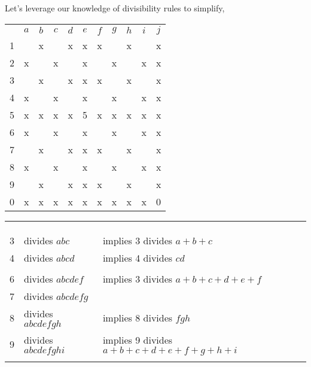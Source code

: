 Let's leverage our knowledge of divisibility rules to simplify,
\begin{center}
\begin{tabular}{ccccccccccc}
			&	$a$	&	$b$	&	$c$	&	$d$	&	$e$	&	$f$	&	$g$	&	$h$	&	$i$	&	$j$	\\
	1		&		&	x	&		&	x	&	x	&	x	&		&	x	&		&	x	\\
	2		&	x	&		&	x	&		&	x	&		&	x	&		&	x	&	x	\\
	3		&		&	x	&		&	x	&	x	&	x	&		&	x	&		&	x	\\
	4		&	x	&		&	x	&		&	x	&		&	x	&		&	x	&	x	\\
	5		&	x	&	x	&	x	&	x	&	5	&	x	&	x	&	x	&	x	&	x	\\
	6		&	x	&		&	x	&		&	x	&		&	x	&		&	x	&	x	\\
	7		&		&	x	&		&	x	&	x	&	x	&		&	x	&		&	x	\\
	8		&	x	&		&	x	&		&	x	&		&	x	&		&	x	&	x	\\
	9		&		&	x	&		&	x	&	x	&	x	&		&	x	&		&	x	\\
	0		&	x	&	x	&	x	&	x	&	x	&	x	&	x	&	x	&	x	&	0	\\
\end{tabular}
\hspace{1cm}\vline\hspace{1cm}
\begin{tabular}{rll}
	& 		\\
	& 		\\
	& 		\\
	3	&	divides $abc$			& implies 3 divides $a+b+c$					\\
	4	&	divides $abcd$			& implies 4 divides $cd$					\\
		&	\\
	6	&	divides $abcdef$		& implies 3 divides $a+b+c+d+e+f$			\\
	7	&	divides $abcdefg$				\\
	8	&	divides $abcdefgh$		& implies 8 divides $fgh$					\\
	9	&	divides $abcdefghi$		& implies 9 divides $a+b+c+d+e+f+g+h+i$		\\
		&	
\end{tabular}
\end{center}

